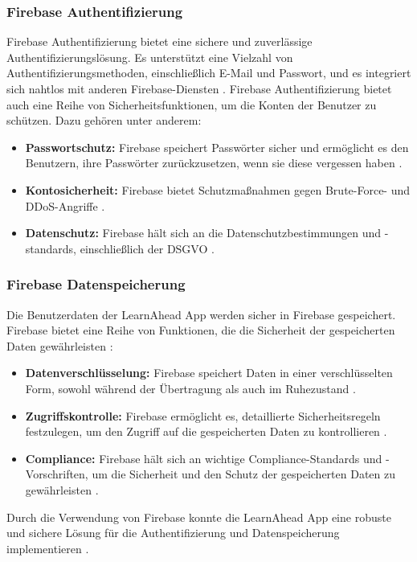 \subsubsection{Firebase Authentifizierung}
Firebase Authentifizierung bietet eine sichere und zuverlässige Authentifizierungslösung. Es unterstützt eine Vielzahl von Authentifizierungsmethoden, einschließlich E-Mail und Passwort, und es integriert sich nahtlos mit anderen Firebase-Diensten \cite{firebase_auth}.\newline
Firebase Authentifizierung bietet auch eine Reihe von Sicherheitsfunktionen, um die Konten der Benutzer zu schützen. Dazu gehören unter anderem:
\begin{itemize}
    \item \textbf{Passwortschutz:} Firebase speichert Passwörter sicher und ermöglicht es den Benutzern, ihre Passwörter zurückzusetzen, wenn sie diese vergessen haben \cite{firebase_auth}.
    \item \textbf{Kontosicherheit:} Firebase bietet Schutzmaßnahmen gegen Brute-Force- und DDoS-Angriffe \cite{firebase_security}.
    \item \textbf{Datenschutz:} Firebase hält sich an die Datenschutzbestimmungen und -standards, einschließlich der DSGVO \cite{firebase_privacy}.
\end{itemize}
\subsubsection{Firebase Datenspeicherung}
Die Benutzerdaten der LearnAhead App werden sicher in Firebase gespeichert. Firebase bietet eine Reihe von Funktionen, die die Sicherheit der gespeicherten Daten gewährleisten \cite{firebase_storage}:
\begin{itemize}
    \item \textbf{Datenverschlüsselung:} Firebase speichert Daten in einer verschlüsselten Form, sowohl während der Übertragung als auch im Ruhezustand \cite{firebase_encryption}.
    \item \textbf{Zugriffskontrolle:} Firebase ermöglicht es, detaillierte Sicherheitsregeln festzulegen, um den Zugriff auf die gespeicherten Daten zu kontrollieren \cite{firebase_access_control}.
    \item \textbf{Compliance:} Firebase hält sich an wichtige Compliance-Standards und -Vorschriften, um die Sicherheit und den Schutz der gespeicherten Daten zu gewährleisten \cite{firebase_compliance}.
\end{itemize}
Durch die Verwendung von Firebase konnte die LearnAhead App eine robuste und sichere Lösung für die Authentifizierung und Datenspeicherung implementieren \cite{firebase_overview}.




